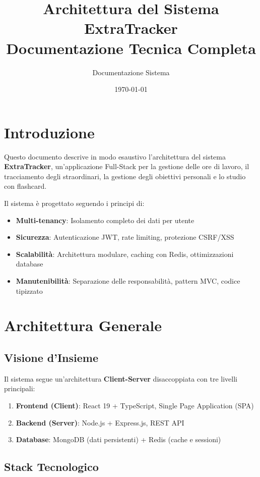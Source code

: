 \documentclass[11pt,a4paper]{article}
\title{\textbf{Architettura del Sistema ExtraTracker}\\
\large Documentazione Tecnica Completa}
\author{Documentazione Sistema}
\date{\today}
\begin{document}
\maketitle
\tableofcontents
\newpage

\section{Introduzione}

Questo documento descrive in modo esaustivo l'architettura del sistema \textbf{ExtraTracker}, un'applicazione Full-Stack per la gestione delle ore di lavoro, il tracciamento degli straordinari, la gestione degli obiettivi personali e lo studio con flashcard.

Il sistema è progettato seguendo i principi di:
\begin{itemize}
    \item \textbf{Multi-tenancy}: Isolamento completo dei dati per utente
    \item \textbf{Sicurezza}: Autenticazione JWT, rate limiting, protezione CSRF/XSS
    \item \textbf{Scalabilità}: Architettura modulare, caching con Redis, ottimizzazioni database
    \item \textbf{Manutenibilità}: Separazione delle responsabilità, pattern MVC, codice tipizzato
\end{itemize}

\section{Architettura Generale}

\subsection{Visione d'Insieme}

Il sistema segue un'architettura \textbf{Client-Server} disaccoppiata con tre livelli principali:

\begin{enumerate}
    \item \textbf{Frontend (Client)}: React 19 + TypeScript, Single Page Application (SPA)
    \item \textbf{Backend (Server)}: Node.js + Express.js, REST API
    \item \textbf{Database}: MongoDB (dati persistenti) + Redis (cache e sessioni)
\end{enumerate}

\subsection{Stack Tecnologico}
\end{document}
